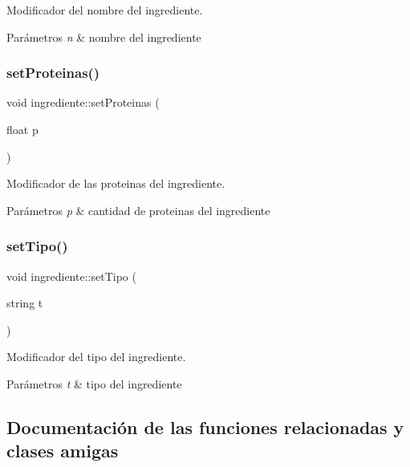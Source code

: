 Modificador del nombre del ingrediente. 


\begin{DoxyParams}{Parámetros}
{\em n} & nombre del ingrediente \\
\hline
\end{DoxyParams}
\mbox{\label{classingrediente_a5ee4fac5c35f8ff71e7f974d1675a626}} 
\subsubsection{\texorpdfstring{set\+Proteinas()}{setProteinas()}}
{\footnotesize\ttfamily void ingrediente\+::set\+Proteinas (\begin{DoxyParamCaption}\item[{float}]{p }\end{DoxyParamCaption})}



Modificador de las proteinas del ingrediente. 


\begin{DoxyParams}{Parámetros}
{\em p} & cantidad de proteinas del ingrediente \\
\hline
\end{DoxyParams}
\mbox{\label{classingrediente_ae51c71ad615844974ee24bb2fe9c7b80}} 
\subsubsection{\texorpdfstring{set\+Tipo()}{setTipo()}}
{\footnotesize\ttfamily void ingrediente\+::set\+Tipo (\begin{DoxyParamCaption}\item[{string}]{t }\end{DoxyParamCaption})}



Modificador del tipo del ingrediente. 


\begin{DoxyParams}{Parámetros}
{\em t} & tipo del ingrediente \\
\hline
\end{DoxyParams}


\subsection{Documentación de las funciones relacionadas y clases amigas}
\mbox{\label{classingrediente_ae7d30d9b20aead90a4d3b11a4ff57e21}} 
